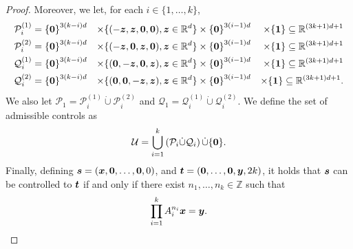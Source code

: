\begin{proof}
Moreover, we let, for each $i \in \lbrace 1, \ldots, k \rbrace$,
\begin{align*}
\mathcal{P}_{i}^{(1)} &= {\lbrace \boldsymbol{0} \rbrace}^{3(k-i)d} &\times
\lbrace (-\boldsymbol{z}, \boldsymbol{z}, \boldsymbol{0}, \boldsymbol{0}), \boldsymbol{z} \in \mathbb{R}^{d} \rbrace &\times
{\lbrace \boldsymbol{0} \rbrace}^{3(i-1)d} &\times \lbrace \boldsymbol{1} \rbrace
\subseteq \mathbb{R}^{(3k+1)d+1} \\
\mathcal{P}_{i}^{(2)} &= {\lbrace \boldsymbol{0} \rbrace}^{3(k-i)d} &\times
\lbrace (-\boldsymbol{z}, \boldsymbol{0}, \boldsymbol{z}, \boldsymbol{0}), \boldsymbol{z} \in \mathbb{R}^{d} \rbrace &\times
{\lbrace \boldsymbol{0} \rbrace}^{3(i-1)d} &\times \lbrace \boldsymbol{1} \rbrace
\subseteq \mathbb{R}^{(3k+1)d+1} \\
\mathcal{Q}_{i}^{(1)} &= {\lbrace \boldsymbol{0} \rbrace}^{3(k-i)d} &\times
\lbrace (\boldsymbol{0}, -\boldsymbol{z}, \boldsymbol{0}, \boldsymbol{z}), \boldsymbol{z} \in \mathbb{R}^{d} \rbrace &\times
{\lbrace \boldsymbol{0} \rbrace}^{3(i-1)d} &\times \lbrace \boldsymbol{1} \rbrace
\subseteq \mathbb{R}^{(3k+1)d+1} \\
\mathcal{Q}_{i}^{(2)} &= {\lbrace \boldsymbol{0} \rbrace}^{3(k-i)d} &\times
\lbrace (\boldsymbol{0}, \boldsymbol{0}, -\boldsymbol{z}, \boldsymbol{z}), \boldsymbol{z} \in \mathbb{R}^{d} \rbrace &\times
{\lbrace \boldsymbol{0} \rbrace}^{3(i-1)d} &\times \lbrace \boldsymbol{1} \rbrace
\subseteq \mathbb{R}^{(3k+1)d+1}.
\end{align*}
We also let $\mathcal{P}_{1} = \mathcal{P}_{i}^{(1)} \dot{\cup} \mathcal{P}_{i}^{(2)}$ and $\mathcal{Q}_{1} = \mathcal{Q}_{i}^{(1)} \dot{\cup} \mathcal{Q}_{i}^{(2)}$.
We define the set of admissible controls as
\begin{align*}
\mathcal{U} = \bigcup\limits_{i=1}^{k} \left( \mathcal{P}_{i} \dot{\cup} \mathcal{Q}_{i} \right) \dot{\cup} \lbrace \boldsymbol{0} \rbrace.
\end{align*}
Finally, defining $\boldsymbol{s} = (\boldsymbol{x}, \boldsymbol{0}, \ldots, \boldsymbol{0}, 0)$, and $\boldsymbol{t} = (\boldsymbol{0}, \ldots, \boldsymbol{0}, \boldsymbol{y}, 2k)$, it holds that $\boldsymbol{s}$ can be controlled to $\boldsymbol{t}$ if and only if there exist $n_{1}, \ldots, n_{k} \in \mathbb{Z}$ such that
\begin{equation*}
\prod\limits_{i=1}^{k}A_{i}^{n_{i}} \boldsymbol{x} = \boldsymbol{y}.
\end{equation*}


\end{proof}
